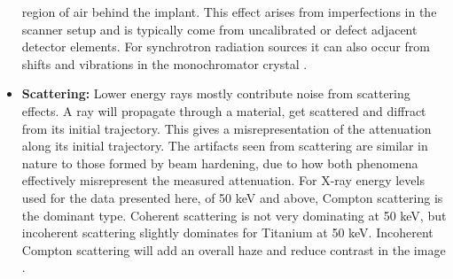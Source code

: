 \begin{itemize}
		region of air behind the implant. This effect arises from
		imperfections in the scanner setup and is typically come from
		uncalibrated or defect adjacent detector elements. For
		synchrotron radiation sources it can also occur from shifts and
		vibrations in the monochromator crystal \citep{ringartefacts}.
	\item \textbf{Scattering:} Lower energy rays mostly contribute noise
		from scattering effects. A ray will propagate through a
		material, get scattered and diffract from its initial
		trajectory. This gives a misrepresentation of the attenuation
		along its initial trajectory. The artifacts seen from
		scattering are similar in nature to those formed by beam
		hardening, due to how both phenomena effectively misrepresent
		the measured attenuation.  For X-ray energy levels used for the
		data presented here, of 50 keV and above, Compton scattering is
		the dominant type.  Coherent scattering is not very dominating
		at 50 keV, but incoherent scattering slightly dominates for
		Titanium at 50 keV. Incoherent Compton scattering will add an
		overall haze and reduce contrast in the image
		\citep{Compton}\citep{xray-attenuation-10-kev-100-mev}\citep{attenuation-cross-sections}.
\end{itemize}

